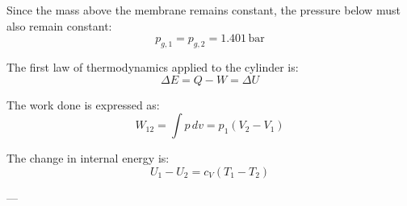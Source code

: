 Since the mass above the membrane remains constant, the pressure below must also remain constant:  
\[
p_{g,1} = p_{g,2} = 1.401 \, \text{bar}
\]

The first law of thermodynamics applied to the cylinder is:  
\[
\Delta E = Q - W = \Delta U
\]

The work done is expressed as:  
\[
W_{12} = \int p \, dv = p_1 (V_2 - V_1)
\]

The change in internal energy is:  
\[
U_1 - U_2 = c_V (T_1 - T_2)
\]

---